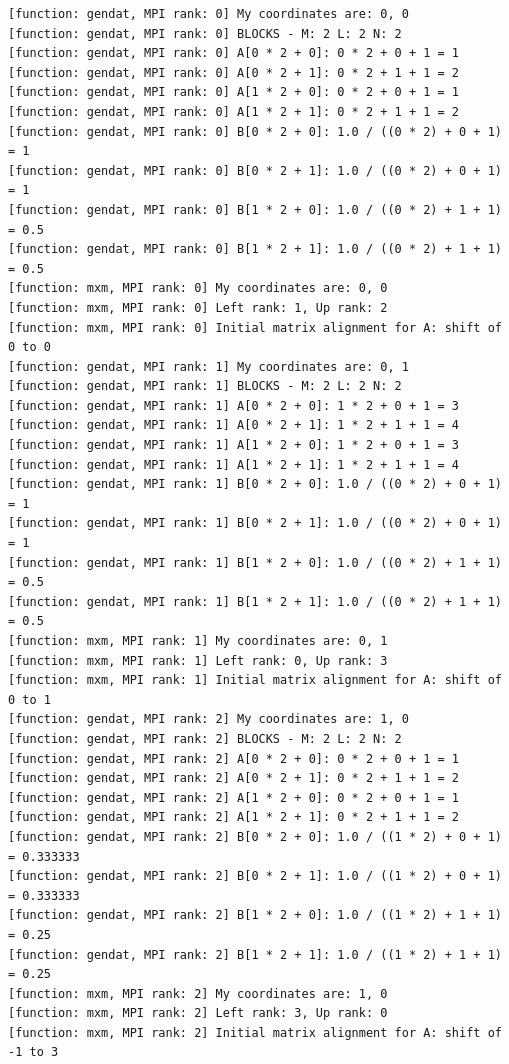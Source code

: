 \begin{lstlisting}
[function: gendat, MPI rank: 0] My coordinates are: 0, 0
[function: gendat, MPI rank: 0] BLOCKS - M: 2 L: 2 N: 2
[function: gendat, MPI rank: 0] A[0 * 2 + 0]: 0 * 2 + 0 + 1 = 1
[function: gendat, MPI rank: 0] A[0 * 2 + 1]: 0 * 2 + 1 + 1 = 2
[function: gendat, MPI rank: 0] A[1 * 2 + 0]: 0 * 2 + 0 + 1 = 1
[function: gendat, MPI rank: 0] A[1 * 2 + 1]: 0 * 2 + 1 + 1 = 2
[function: gendat, MPI rank: 0] B[0 * 2 + 0]: 1.0 / ((0 * 2) + 0 + 1) = 1
[function: gendat, MPI rank: 0] B[0 * 2 + 1]: 1.0 / ((0 * 2) + 0 + 1) = 1
[function: gendat, MPI rank: 0] B[1 * 2 + 0]: 1.0 / ((0 * 2) + 1 + 1) = 0.5
[function: gendat, MPI rank: 0] B[1 * 2 + 1]: 1.0 / ((0 * 2) + 1 + 1) = 0.5
[function: mxm, MPI rank: 0] My coordinates are: 0, 0
[function: mxm, MPI rank: 0] Left rank: 1, Up rank: 2
[function: mxm, MPI rank: 0] Initial matrix alignment for A: shift of 0 to 0
[function: gendat, MPI rank: 1] My coordinates are: 0, 1
[function: gendat, MPI rank: 1] BLOCKS - M: 2 L: 2 N: 2
[function: gendat, MPI rank: 1] A[0 * 2 + 0]: 1 * 2 + 0 + 1 = 3
[function: gendat, MPI rank: 1] A[0 * 2 + 1]: 1 * 2 + 1 + 1 = 4
[function: gendat, MPI rank: 1] A[1 * 2 + 0]: 1 * 2 + 0 + 1 = 3
[function: gendat, MPI rank: 1] A[1 * 2 + 1]: 1 * 2 + 1 + 1 = 4
[function: gendat, MPI rank: 1] B[0 * 2 + 0]: 1.0 / ((0 * 2) + 0 + 1) = 1
[function: gendat, MPI rank: 1] B[0 * 2 + 1]: 1.0 / ((0 * 2) + 0 + 1) = 1
[function: gendat, MPI rank: 1] B[1 * 2 + 0]: 1.0 / ((0 * 2) + 1 + 1) = 0.5
[function: gendat, MPI rank: 1] B[1 * 2 + 1]: 1.0 / ((0 * 2) + 1 + 1) = 0.5
[function: mxm, MPI rank: 1] My coordinates are: 0, 1
[function: mxm, MPI rank: 1] Left rank: 0, Up rank: 3
[function: mxm, MPI rank: 1] Initial matrix alignment for A: shift of 0 to 1
[function: gendat, MPI rank: 2] My coordinates are: 1, 0
[function: gendat, MPI rank: 2] BLOCKS - M: 2 L: 2 N: 2
[function: gendat, MPI rank: 2] A[0 * 2 + 0]: 0 * 2 + 0 + 1 = 1
[function: gendat, MPI rank: 2] A[0 * 2 + 1]: 0 * 2 + 1 + 1 = 2
[function: gendat, MPI rank: 2] A[1 * 2 + 0]: 0 * 2 + 0 + 1 = 1
[function: gendat, MPI rank: 2] A[1 * 2 + 1]: 0 * 2 + 1 + 1 = 2
[function: gendat, MPI rank: 2] B[0 * 2 + 0]: 1.0 / ((1 * 2) + 0 + 1) = 0.333333
[function: gendat, MPI rank: 2] B[0 * 2 + 1]: 1.0 / ((1 * 2) + 0 + 1) = 0.333333
[function: gendat, MPI rank: 2] B[1 * 2 + 0]: 1.0 / ((1 * 2) + 1 + 1) = 0.25
[function: gendat, MPI rank: 2] B[1 * 2 + 1]: 1.0 / ((1 * 2) + 1 + 1) = 0.25
[function: mxm, MPI rank: 2] My coordinates are: 1, 0
[function: mxm, MPI rank: 2] Left rank: 3, Up rank: 0
[function: mxm, MPI rank: 2] Initial matrix alignment for A: shift of -1 to 3

\end{lstlisting}
